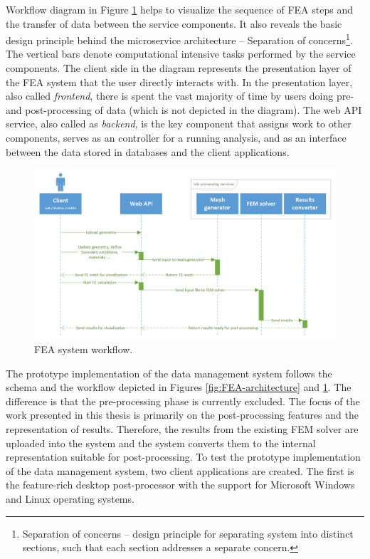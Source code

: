 Workflow diagram in Figure \ref{fig:FEA-workflow} helps to visualize the sequence of FEA steps and the transfer of data between the service components. It also reveals the basic design principle behind the microservice architecture -- Separation of concerns\footnote{Separation of concerns -- design principle for separating system into distinct sections, such that each section addresses a separate concern.}. The vertical bars denote computational intensive tasks performed by the service components. The client side in the diagram represents the presentation layer of the FEA system that the user directly interacts with. In the presentation layer, also called \textit{frontend}, there is spent the vast majority of time by users doing pre- and post-processing of data (which is not depicted in the diagram). The web API service, also called as \textit{backend}, is the key component that assigns work to other components, serves as an controller for a running analysis, and as an interface between the data stored in databases and the client applications.

\begin{figure}[H]
    \centering
    \includegraphics[width=\textwidth]{figures/chapter-data-management/FEA-workflow}
    \decoRule
    \caption{FEA system workflow.}
    \label{fig:FEA-workflow}
\end{figure}

The prototype implementation of the data management system follows the schema and the workflow depicted in Figures \ref{fig:FEA-architecture} and \ref{fig:FEA-workflow}. The difference is that the pre-processing phase is currently excluded. The focus of the work presented in this thesis is primarily on the post-processing features and the representation of results. Therefore, the results from the existing FEM solver are uploaded into the system and the system converts them to the internal representation suitable for post-processing. To test the prototype implementation of the data management system, two client applications are created. The first is the feature-rich desktop post-processor with the support for Microsoft Windows and Linux operating systems.


